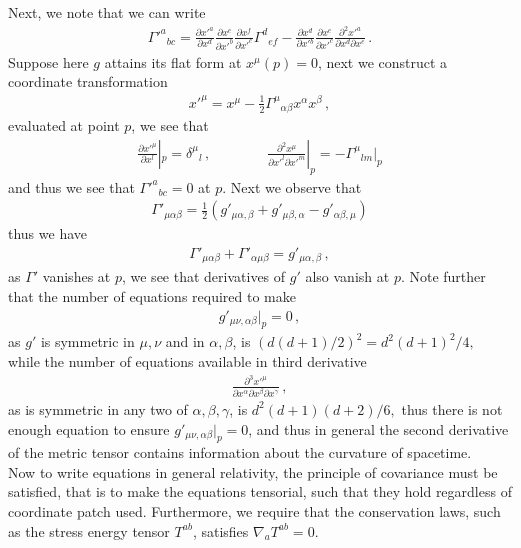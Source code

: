 \documentclass[11pt, onesided]{book}
\theoremstyle{break}
\theoremstyle{break}
\newcommand{\pd}{\partial}
\begin{document}
Next, we note that we can write
\begin{align*}
\Gamma'^a{}_{bc} = \frac{\pd x'^a}{\pd x^d}\frac{\pd x^e}{\pd x'^b}\frac{\pd x^f}{\pd x'^c}\Gamma^d{}_{ef} - \frac{\pd x^d}{\pd x'{}^b}\frac{\pd x^e}{\pd x'^c}\frac{\pd^2 x'^a}{\pd x^d\pd x^e}\,.
\end{align*}
Suppose here $g$ attains its flat form at $x^\mu(p) = 0$, next we construct a coordinate transformation
\begin{align*}
x'^\mu = x^\mu - \frac{1}{2}\Gamma^{\mu}{}_{\alpha\beta}x^\alpha x^\beta\,,
\end{align*}
evaluated at point $p$, we see that
\begin{align*}
\frac{\pd x'^\mu}{\pd x^l}|_p = \delta^\mu{}_l\,,\qquad	\qquad
\frac{\pd^2 x^\mu}{\pd x'^l \pd x'^m}|_p = -\Gamma^\mu{}_{lm}|_p
\end{align*}
and thus we see that $\Gamma'^{a}{}_{bc} = 0$ at $p$. Next we observe that
\begin{align*}
\Gamma'_{\mu\alpha\beta} = \frac{1}{2}\left( g'_{\mu\alpha,\beta} + g'_{\mu\beta, \alpha} - g'_{\alpha\beta,  \mu}\right)
\end{align*}
thus we have
\begin{align*}
\Gamma'_{\mu\alpha\beta } + \Gamma'_{\alpha\mu\beta} = g'_{\mu\alpha,\beta}\,,
\end{align*}
as $\Gamma'$ vanishes at $p$, we see that derivatives of $g'$ also vanish at $p$. Note further that the number of equations required to make
\begin{align*}
g'_{\mu\nu,\alpha\beta}|_p = 0\,,
\end{align*}
as $g'$ is symmetric in $\mu,\nu$ and in $\alpha,\beta$, is  $( d(d+1)/2)^2 = d^2(d+1)^2/4,$ while the number of equations available in third derivative 
\begin{align*}
\frac{\pd^3 x'^\mu}{\pd x^\alpha \pd x^\beta \pd x^\gamma}\,,
\end{align*}
as is symmetric in any two of $\alpha,\beta,\gamma$, is $d^2(d+1)(d+2)/{6},$
thus there is not enough equation to ensure $g'_{\mu\nu,\alpha\beta}|_p = 0$, and thus in general the second derivative of the metric tensor contains information about the curvature of spacetime.\\

Now to write equations in general relativity, the principle of covariance must be satisfied, that is to make the equations tensorial, such that they hold regardless of coordinate patch used. Furthermore, we require that the conservation laws, such as the stress energy tensor $T^{ab}$, satisfies $\nabla_a T^{ab} = 0$.\\
\end{document}
